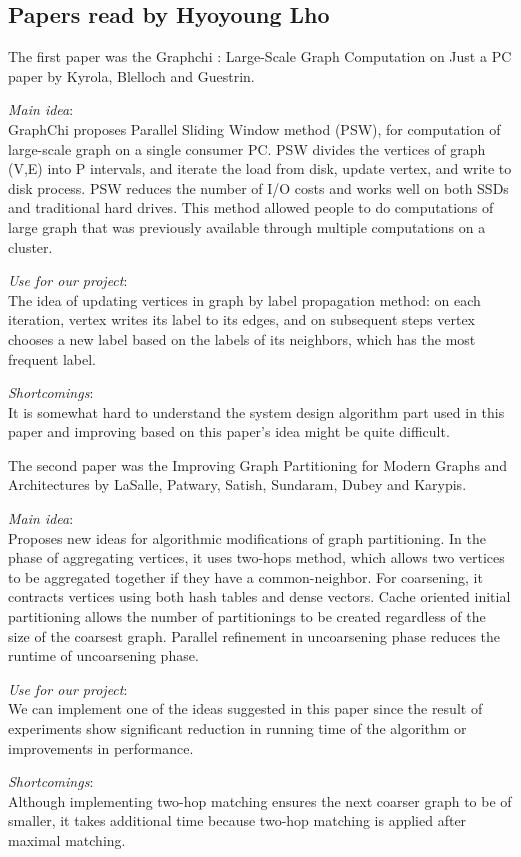 \subsection{Papers read by Hyoyoung Lho }
The first paper was the Graphchi : Large-Scale Graph Computation on Just a PC paper by Kyrola, Blelloch and Guestrin.
\cite{GraphChi}
\begin{itemize*}
\item {\em Main idea}: \\
GraphChi proposes Parallel Sliding Window method (PSW), for computation of large-scale graph on a single consumer PC. PSW divides the vertices of graph (V,E) into P intervals, and iterate the load from disk, update vertex, and write to disk process. PSW reduces the number of I/O costs and works well on both SSDs and traditional hard drives. This method allowed people to do computations of large graph that was previously available through multiple computations on a cluster.
\item {\em Use for our project}: \\
The idea of updating vertices in graph by label propagation method: on each iteration, vertex writes its label to its edges, and on subsequent steps vertex chooses a new label based on the labels of its neighbors, which has the most frequent label.
\item {\em Shortcomings}: \\
It is somewhat hard to understand the system design algorithm part used in this paper and improving based on this paper's idea might be quite difficult.

\end{itemize*}
The second paper was the Improving Graph Partitioning for Modern Graphs and Architectures by LaSalle, Patwary, Satish, Sundaram, Dubey and Karypis.
\cite{Improving}
\begin{itemize*}
\item {\em Main idea}: \\
Proposes new ideas for algorithmic modifications of graph partitioning. In the phase of aggregating vertices, it uses two-hops method, which allows two vertices to be aggregated together if they have a common-neighbor. For coarsening, it contracts vertices using both hash tables and dense vectors. Cache oriented initial partitioning allows the number of partitionings to be created regardless of the size of the coarsest graph. Parallel refinement in uncoarsening phase reduces the runtime of uncoarsening phase.
\item {\em Use for our project}: \\
We can implement one of the ideas suggested in this paper since the result of experiments show significant reduction in running time of the algorithm or improvements in performance.
\item {\em Shortcomings}: \\
Although implementing two-hop matching ensures the next coarser graph to be of smaller, it takes additional time because two-hop matching is applied after maximal matching.
\end{itemize*}

